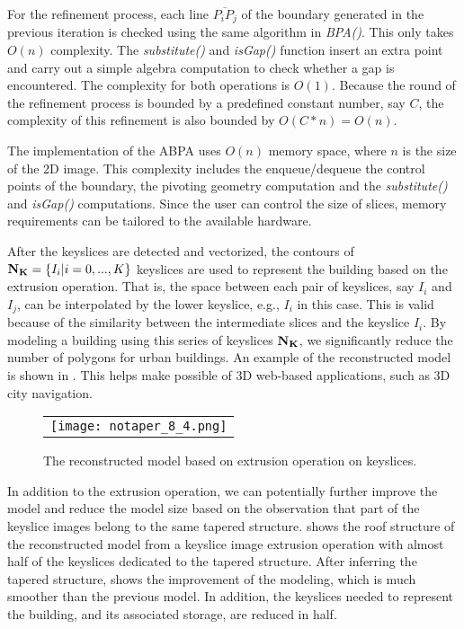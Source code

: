 For the refinement process, each line $\overline{P_iP_j}$ of the boundary generated
in the previous iteration is checked using the same algorithm in {\it BPA()}.
This only takes $O(n)$ complexity.
The {\it substitute()} and {\it isGap()} function insert an extra point
and carry out a simple algebra computation to check whether a gap is encountered.
The complexity for both operations is $O(1)$.
Because the round of the refinement process is bounded by a predefined constant number,
say $C$, the complexity of this refinement is also bounded by $O(C*n) = O(n)$.

The implementation of the ABPA uses $O(n)$ memory space,
where $n$ is the size of the 2D image.
This complexity includes the enqueue/dequeue the control points of the boundary,
the pivoting geometry computation and the {\it substitute()} and {\it isGap()} computations.
Since the user can control the size of slices,
memory requirements can be tailored to the available hardware.


After the keyslices are detected and vectorized, the contours of
${\bf N_K} = \{I_i | i = 0, ..., K \}$ keyslices are used to represent
the building based on the extrusion operation.
That is, the space between each pair of keyslices, say $I_{i}$ and $I_{j}$,
can be interpolated by the lower keyslice, e.g., $I_{i}$ in this case.
This is valid because of the similarity between the intermediate slices
and the keyslice $I_{i}$.
By modeling a building using this series of keyslices ${\bf N_K}$,
we significantly reduce the number of polygons for urban buildings.
An example of the reconstructed model is shown in .
This helps make possible of 3D web-based applications,
such as 3D city navigation.

\begin{figure}[htbp]
\begin{center}
\begin{tabular}{c}
\texttt{[image: notaper\_8\_4.png]}
\end{tabular}
\end{center}
\caption{ The reconstructed model based on extrusion operation on keyslices. }
\label{fig:DXF_notaper_model}
\end{figure}

In addition to the extrusion operation,
we can potentially further improve the model and reduce the model size
based on the observation that part of the keyslice images
belong to the same tapered structure.
 shows the roof structure of the reconstructed model
from a keyslice image extrusion operation with
almost half of the keyslices dedicated to the tapered structure.
After inferring the tapered structure,  shows the improvement
of the modeling, which is much smoother than the previous model.
In addition, the keyslices needed to represent the building,
and its associated storage, are reduced in half.

